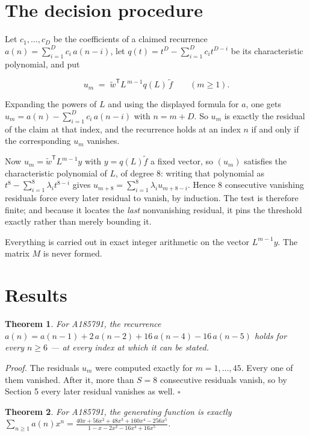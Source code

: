 \documentclass[11pt]{article}
\newtheorem{theorem}{Theorem}
\theoremstyle{definition}
\begin{document}
\section{The decision procedure}

Let $c_1,\dots,c_D$ be the coefficients of a claimed recurrence $a(n) = \sum_{i=1}^{D} c_i\,a(n-i)$, let $q(t) = t^{D} - \sum_{i=1}^{D} c_i t^{D-i}$ be its characteristic polynomial, and put

\[u_m \;=\; \tilde w^{\mathsf T} L^{\,m-1} q(L)\,\tilde f \qquad (m \ge 1).\]

Expanding the powers of $L$ and using the displayed formula for $a$, one gets $u_m = a(n) - \sum_{i=1}^{D} c_i\,a(n-i)$ with $n = m + D$. So $u_m$ is exactly the residual of the claim at that index, and the recurrence holds at an index $n$ if and only if the corresponding $u_m$ vanishes.

Now $u_m = \tilde w^{\mathsf T} L^{m-1} y$ with $y = q(L)\tilde f$ a fixed vector, so $(u_m)$ satisfies the characteristic polynomial of $L$, of degree $8$: writing that polynomial as $t^{8} - \sum_{i=1}^{8} \lambda_i t^{8-i}$ gives $u_{m+8} = \sum_{i=1}^{8} \lambda_i u_{m+8-i}$. Hence $8$ consecutive vanishing residuals force every later residual to vanish, by induction. The test is therefore finite; and because it locates the {\itshape last} nonvanishing residual, it pins the threshold exactly rather than merely bounding it.

Everything is carried out in exact integer arithmetic on the vector $L^{m-1}y$. The matrix $M$ is never formed.

\section{Results}

\begin{theorem} For A185791, the recurrence $a(n) = a(n-1) + 2\,a(n-2) + 16\,a(n-4) - 16\,a(n-5)$ holds for every $n \ge 6$ --- at every index at which it can be stated.\end{theorem}

{\itshape Proof.} The residuals $u_m$ were computed exactly for $m = 1,\dots,45$. Every one of them vanished. After it, more than $S = 8$ consecutive residuals vanish, so by Section 5 every later residual vanishes as well. $\square$

\begin{theorem} For A185791, the generating function is exactly $\sum_{n\ge 1} a(n)x^n = \frac{40x + 56x^{2} + 48x^{3} + 160x^{4} - 256x^{5}}{1 - x - 2x^{2} - 16x^{4} + 16x^{5}}$.\end{theorem}
\end{document}
